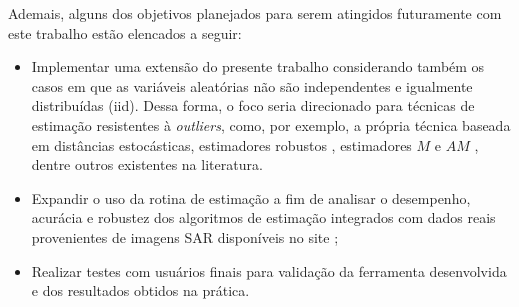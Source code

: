 Ademais, alguns dos objetivos planejados para serem atingidos futuramente com este trabalho estão elencados a seguir:
\begin{itemize}
    \item Implementar uma extensão do presente trabalho considerando também os casos em que as variáveis aleatórias não são independentes e igualmente distribuídas (iid). Dessa forma, o foco seria direcionado para técnicas de estimação resistentes à \textit{outliers}, como, por exemplo, a própria técnica baseada em distâncias estocásticas, estimadores robustos \citep{Wang2017}, estimadores $M$ \citep{BustosFreryLucini:Mestimators:2001} e $AM$ \citep{AllendeFreryetal:JSCS:05}, dentre outros existentes na literatura.
    \item Expandir o uso da rotina de estimação a fim de analisar o desempenho, acurácia e robustez dos algoritmos de estimação integrados com dados reais provenientes de imagens SAR disponíveis no site \citet{PoISARpro};
    \item Realizar testes com usuários finais para validação da ferramenta desenvolvida e dos resultados obtidos na prática.
\end{itemize}